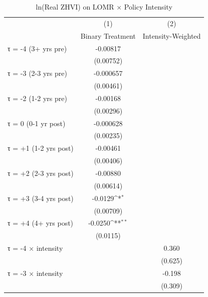 \begin{table}[htbp]\centering
\def\sym#1{\ifmmode^{#1}\else\(^{#1}\)\fi}
\caption{ln(Real ZHVI) on LOMR × Policy Intensity}
\begin{tabular}{l*{2}{c}}
\hline\hline
                    &\multicolumn{1}{c}{(1)}&\multicolumn{1}{c}{(2)}\\
                    &\multicolumn{1}{c}{Binary Treatment}&\multicolumn{1}{c}{Intensity-Weighted}\\
\hline
τ = -4 (3+ yrs pre) &    -0.00817         &                     \\
                    &   (0.00752)         &                     \\
[1em]
τ = -3 (2-3 yrs pre)&   -0.000657         &                     \\
                    &   (0.00461)         &                     \\
[1em]
τ = -2 (1-2 yrs pre)&    -0.00168         &                     \\
                    &   (0.00296)         &                     \\
[1em]
τ = 0 (0-1 yr post) &   -0.000628         &                     \\
                    &   (0.00235)         &                     \\
[1em]
τ = +1 (1-2 yrs post)&    -0.00461         &                     \\
                    &   (0.00406)         &                     \\
[1em]
τ = +2 (2-3 yrs post)&    -0.00880         &                     \\
                    &   (0.00614)         &                     \\
[1em]
τ = +3 (3-4 yrs post)&     -0.0129\sym{*}  &                     \\
                    &   (0.00709)         &                     \\
[1em]
τ = +4 (4+ yrs post)&     -0.0250\sym{**} &                     \\
                    &    (0.0115)         &                     \\
[1em]
τ = -4 × intensity  &                     &       0.360         \\
                    &                     &     (0.625)         \\
[1em]
τ = -3 × intensity  &                     &      -0.198         \\
                    &                     &     (0.309)         \\

\end{tabular}
\end{table}
